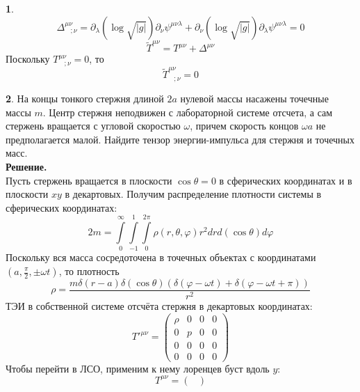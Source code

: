 \documentclass[12pt]{article}
\theoremstyle{definition}
\newtheorem{zad}{}[section]
\begin{document}
\begin{zad}
\begin{equation}
\end{equation}
\begin{equation}
    \boxed{\Delta^{\mu\nu}_{\;\;\;;\nu}=\partial_\lambda(\log\sqrt{|g|})\partial_\nu\psi^{\mu\nu\lambda}+\partial_\nu(\log\sqrt{|g|})\partial_\lambda\psi^{\mu\nu\lambda}=0}
\end{equation}
\begin{equation}
    \tilde T^{\mu\nu}=T^{\mu\nu}+\Delta^{\mu\nu}
\end{equation}
Поскольку $T^{\mu\nu}_{\;\;\;;\nu}=0$, то
\begin{equation}
    \boxed{\tilde T^{\mu\nu}_{\;\;\;;\nu}=0}
\end{equation}
\end{zad}
\begin{zad}
На концы тонкого стержня длиной $2a$ нулевой массы насажены точечные массы $m$. Центр стержня неподвижен с лабораторной системе отсчета, а сам стержень вращается с угловой скоростью $\omega$, причем скорость концов $\omega a$ не предполагается малой. Найдите тензор энергии-импульса для стержня и точечных масс.\\
\textbf{Решение.}\\
Пусть стержень вращается в плоскости $\cos\theta=0$ в сферических координатах и в плоскости $xy$ в декартовых. Получим распределение плотности системы в сферических координатах:
\begin{equation}
    2m=\int\limits_0^\infty\int\limits_{-1}^1\int\limits_0^{2\pi}\rho(r,\theta,\varphi)r^2drd(\cos\theta)d\varphi
\end{equation}
Поскольку вся масса сосредоточена в точечных объектах с координатами $(a,\frac{\pi}{2},\pm\omega t)$, то плотность
\begin{equation}
    \rho=\frac{m\delta(r-a)\delta(\cos\theta)(\delta(\varphi-\omega t)+\delta(\varphi-\omega t+\pi))}{r^2}
\end{equation}
ТЭИ в собственной системе отсчёта стержня в декартовых координатах:
\begin{equation}
    T'^{\mu\nu}=\begin{pmatrix}
    \rho & 0 & 0 & 0\\
    0 & p & 0 & 0\\
    0 & 0 & 0 & 0\\
    0 & 0 & 0 & 0
    \end{pmatrix}
\end{equation}
Чтобы перейти в ЛСО, применим к нему лоренцев буст вдоль $y$:
\begin{equation}
    T^{\mu\nu}=\begin{pmatrix}

\end{pmatrix}
\end{equation}
\end{zad}
\end{document}
